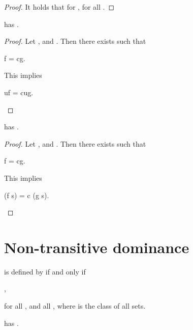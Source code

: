 \documentclass[b5paper, english, oneside]{memoir}
\begin{document}
\begin{proof}
It holds that  for , for all . 
\end{proof}

\begin{theorem}
\label{MultipleSubHomogeneity}
 has .  
\end{theorem}

\begin{proof}
Let , and . Then there exists  such that
\begin{eqs}
f = cg.
\end{eqs}
This implies
\begin{eqs}
uf = cug.
\end{eqs}
  
\end{proof}

\begin{theorem}
\label{MultipleSubComposability}
 has .
\end{theorem}

\begin{proof}
Let , and . Then there exists  such that
\begin{eqs}
f = cg.
\end{eqs}
This implies
\begin{eqs}
(f \circ s) = c (g \circ s).
\end{eqs}
\end{proof}

\section{Non-transitive dominance}
\label{NonTransitiveDominance}

\begin{definition}
  is defined by  if and only if 
\begin{eqs}
 \lor {},
\end{eqs}
for all , and all , where  is the class of all sets.
\end{definition}

\begin{theorem}
\label{NonTransitiveOrder}
 has .
\end{theorem}
\end{document}
